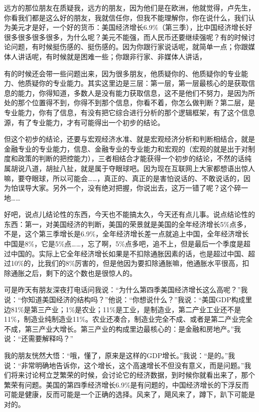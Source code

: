 \documentclass[UTF8, 12pt, a4paper]{ctexrep}
\begin{document}
远方的那位朋友在质疑我，远方的朋友，因为他们是在欧洲，他就觉得，卢先生，你看我们都是这么好的朋友，我就信任你，但我不能理解你，你在说什么，我们认为美元才是好，一个好的货币：美国经济增长6.9\%（第三季），比中国经济增长好很多很多很多很多，为什么呢？美元不能强，而人民币还要继续强呢？有的时候讨论问题，有时候挺伤感的、挺伤感的。因为你跟行家说话呢，就简单一点；你跟媒体人讲话呢，有时候就是困难一些；你跟非行家、非媒体人讲话，

有的时候还会带一些问题出来，因为很多朋友，他质疑你的、他质疑你的专业能力、他质疑你的专业能力。其实这里边是三层：第一层，第一层最核心的是获取信息的能力，你得知道，多数人是没有能力获取信息，这不是他们不努力，是因为所处的那个位置得不到，你得不到那个信息，你看不着，你怎么做判断？第二层，是专业能力，你有了信息，有没有把它综合进行分析的那个逻辑框架，有了这个信息源，有了专业能力，才有可能得出一个初步的结论。

但这个初步的结论，还要与宏观经济水准、就是宏观经济分析和判断相结合，就是金融专业的专业能力，信息、金融专业的专业能力和宏观的（宏观的就是出于对制度和政策的判断的把控能力），三者相结合才能获得一个初步的结论，不然的话纯属胡说八道，胡扯八扯，就是属于夺眼球吧。因为现在互联网上大家都想语出惊人嘛，要夺眼球，所以可能会……，真正的、真正的是害怕说话的、不敢说话的，因为怕误导大家。另外一个，没有绝对把握，你说出去，这万一错了呢？这个碎一地……

好吧，说点儿结论性的东西，今天也不能搞太久，今天还有点儿事。说点结论性的东西：第一，对美国经济的判断，美国的荣景就是美国的全年经济增长5\%点多，不是，这个第三季增长是6.9\%，全年经济增长差一点就追上中国，全年经济增长中国是8\%，它是5\%点……，忘了啊，5\%点多吧，追不上，但是最后一个季度是超过中国的。实际上它全年经济增长如果是不扣除通胀因素的话，也是超过中国、超过10\%的，比我们的8\%厉害的，但是他因为要扣除通胀嘛，他通胀水平很高，扣除通胀之后，剩下的这个数也是很惊人的。

可是昨天有朋友深夜打电话问我说：“为什么第四季美国经济增长这么高呢？”我说：“你知道美国经济的结构吗？”他说：“你想说什么？”我说：“美国GDP构成里边81\%是第三产业；1\%是农业；11\%是工业，是制造业，第二产业工业还不是11\%，制造业纯制造业11\%。农业还凑合，制造业完全不成、或者是第二产业完全不成，第三产业大增长。第三产业的构成里边最核心的：是金融和房地产。”我说：“还需要解释吗？”

我的朋友恍然大悟：“哦，懂了，原来是这样的GDP增长。”我说：“是的。”我说：“非常明确地告诉你，这个增长，这个高速增长不但没有意义，而是问题。”我们将来讨论柯立芝繁荣的时候，会讨论它的经济数据，到时候你就看出来了，那个繁荣有问题。美国的第四季经济增长6.9\%是有问题的，中国经济增长的下浮反而可能是健康，反而可能是一个正确的选择。风来了，飓风来了，蹲下，趴下可能是对的。
\end{document}
